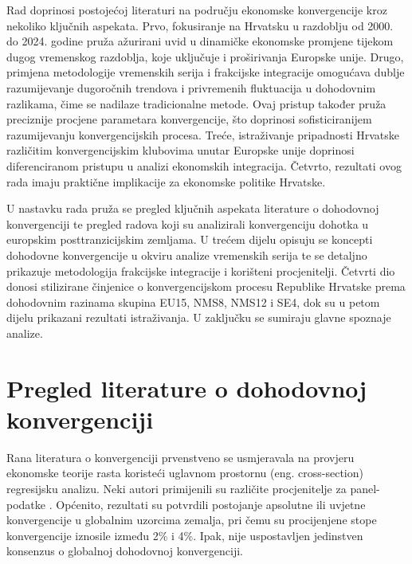 \documentclass{crebsshr}
\begin{document}
    Rad doprinosi postojećoj literaturi na području ekonomske konvergencije kroz nekoliko ključnih aspekata. Prvo, fokusiranje na Hrvatsku u razdoblju od 2000. do 2024. godine pruža ažurirani uvid u dinamičke ekonomske promjene tijekom dugog vremenskog razdoblja, koje uključuje i proširivanja Europske unije. Drugo, primjena metodologije vremenskih serija i frakcijske integracije \citep{Silverberg1999, Cuñado2006, Mello2007, Ayala2012} omogućava dublje razumijevanje dugoročnih trendova i privremenih fluktuacija u dohodovnim razlikama, čime se nadilaze tradicionalne metode. Ovaj pristup također pruža preciznije procjene parametara konvergencije, što doprinosi sofisticiranijem razumijevanju konvergencijskih procesa. Treće, istraživanje pripadnosti Hrvatske različitim konvergencijskim klubovima unutar Europske unije doprinosi diferenciranom pristupu u analizi ekonomskih integracija. Četvrto, rezultati ovog rada imaju praktične implikacije za ekonomske politike Hrvatske.
    
    U nastavku rada pruža se pregled ključnih aspekata literature o dohodovnoj konvergenciji te pregled radova koji su analizirali konvergenciju dohotka u europskim posttranzicijskim zemljama. U trećem dijelu opisuju se koncepti dohodovne konvergencije u okviru analize vremenskih serija te se detaljno prikazuje metodologija frakcijske integracije i korišteni procjenitelji. Četvrti dio donosi stilizirane činjenice o konvergencijskom procesu Republike Hrvatske prema dohodovnim razinama skupina EU15, NMS8, NMS12 i SE4, dok su u petom dijelu prikazani rezultati istraživanja. U zaključku se sumiraju glavne spoznaje analize.
    
    \section{Pregled literature o dohodovnoj konvergenciji}
    
    Rana literatura o konvergenciji prvenstveno se usmjeravala na provjeru ekonomske teorije rasta \citep{Barro1990, Barro1991, Mankiw1992} koristeći uglavnom prostornu (eng. cross-section) regresijsku analizu. Neki autori primijenili su različite procjenitelje za panel-podatke \citep{Knight1993, Islam1995, Caselli1996, Lee1998, Bond2001}. Općenito, rezultati su potvrdili postojanje apsolutne ili uvjetne konvergencije u globalnim uzorcima zemalja, pri čemu su procijenjene stope konvergencije iznosile između 2\% i 4\%. Ipak, nije uspostavljen jedinstven konsenzus o globalnoj dohodovnoj konvergenciji.
    
\end{document}
